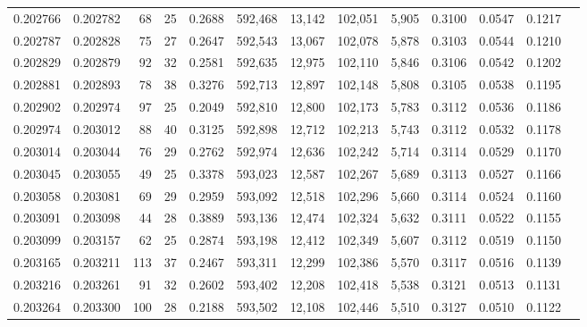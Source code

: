 \begin{tabular}{rrrrrrrrrrrrr}
0.202766 & 0.202782 &    68 &  25 &                                     0.2688 & 592,468 &  13,142 & 102,051 &   5,905 & 0.3100 & 0.0547 & 0.1217 \\
0.202787 & 0.202828 &    75 &  27 &                                     0.2647 & 592,543 &  13,067 & 102,078 &   5,878 & 0.3103 & 0.0544 & 0.1210 \\
0.202829 & 0.202879 &    92 &  32 &                                     0.2581 & 592,635 &  12,975 & 102,110 &   5,846 & 0.3106 & 0.0542 & 0.1202 \\
0.202881 & 0.202893 &    78 &  38 &                                     0.3276 & 592,713 &  12,897 & 102,148 &   5,808 & 0.3105 & 0.0538 & 0.1195 \\
0.202902 & 0.202974 &    97 &  25 &                                     0.2049 & 592,810 &  12,800 & 102,173 &   5,783 & 0.3112 & 0.0536 & 0.1186 \\
0.202974 & 0.203012 &    88 &  40 &                                     0.3125 & 592,898 &  12,712 & 102,213 &   5,743 & 0.3112 & 0.0532 & 0.1178 \\
0.203014 & 0.203044 &    76 &  29 &                                     0.2762 & 592,974 &  12,636 & 102,242 &   5,714 & 0.3114 & 0.0529 & 0.1170 \\
0.203045 & 0.203055 &    49 &  25 &                                     0.3378 & 593,023 &  12,587 & 102,267 &   5,689 & 0.3113 & 0.0527 & 0.1166 \\
0.203058 & 0.203081 &    69 &  29 &                                     0.2959 & 593,092 &  12,518 & 102,296 &   5,660 & 0.3114 & 0.0524 & 0.1160 \\
0.203091 & 0.203098 &    44 &  28 &                                     0.3889 & 593,136 &  12,474 & 102,324 &   5,632 & 0.3111 & 0.0522 & 0.1155 \\
0.203099 & 0.203157 &    62 &  25 &                                     0.2874 & 593,198 &  12,412 & 102,349 &   5,607 & 0.3112 & 0.0519 & 0.1150 \\
0.203165 & 0.203211 &   113 &  37 &                                     0.2467 & 593,311 &  12,299 & 102,386 &   5,570 & 0.3117 & 0.0516 & 0.1139 \\
0.203216 & 0.203261 &    91 &  32 &                                     0.2602 & 593,402 &  12,208 & 102,418 &   5,538 & 0.3121 & 0.0513 & 0.1131 \\
0.203264 & 0.203300 &   100 &  28 &                                     0.2188 & 593,502 &  12,108 & 102,446 &   5,510 & 0.3127 & 0.0510 & 0.1122 \\

\end{tabular}
